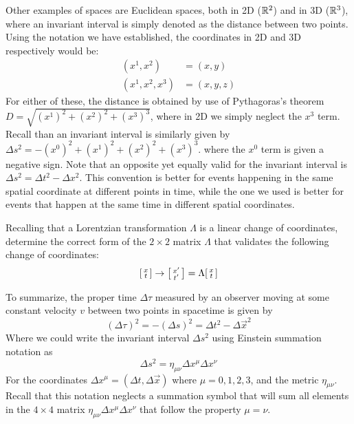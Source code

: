 \documentclass{article}
\begin{document}
 		Other examples of spaces are Euclidean spaces, both in 2D ($\mathbb{R}^2$) and in 3D ($\mathbb{R}^3$), where an invariant interval is simply denoted as the distance between two points. Using the notation we have established, the coordinates in 2D and 3D respectively would be:
 		\begin{align*}
 			(x^1, x^2) &= (x,y) \\
 			(x^1, x^2, x^3) &= (x,y,z)
 		\end{align*}
 		For either of these, the distance is obtained by use of Pythagoras's theorem $D = \sqrt{(x^1)^2 + (x^2)^2 + (x^3)^3}$, where in 2D we simply neglect the $x^3$ term. Recall than an invariant interval is similarly given by $\Delta s^2 = -(x^0)^2 + (x^1)^2 + (x^2)^2 + (x^3)^3$.
 		where the $x^0$ term is given a negative sign. Note that an opposite yet equally valid for the invariant interval is $\Delta s^2 = \Delta t^2 - \Delta x^2 $. This convention is better for events happening in the same spatial coordinate at different points in time, while the one we used is better for events that happen at the same time in different spatial coordinates.
 		\begin{exe}
 			Recalling that a Lorentzian transformation $\Lambda$ is a linear change of coordinates, determine the correct form of the $2 \times 2$ matrix $\Lambda$ that validates the following change of coordinates:
 			$$ \begin{bsmallmatrix}
 				x \\
 				t
 			\end{bsmallmatrix} \to \begin{bsmallmatrix}
 			x' \\
 			t'
 			\end{bsmallmatrix} = \Lambda \begin{bsmallmatrix}
 			x\\t
 		\end{bsmallmatrix}$$
 		\end{exe}
 		
 		To summarize, the proper time $\Delta \tau$ measured by an observer moving at some constant velocity $v$ between two points in spacetime is given by
 		$$ (\Delta \tau)^2 = - (\Delta s)^2 = \Delta t^2 - \Delta \vec{x}^2$$
 		Where we could write the invariant interval $\Delta s^2$ using Einstein summation notation as 
 		$$ \Delta s^2 = \eta_{\mu\nu} \Delta x^\mu \Delta x^\nu$$
 		For the coordinates $\Delta x^\mu = (\Delta t, \Delta \vec{x})$ where $\mu = 0,1,2,3$, and the metric $\eta_{\mu\nu}$. Recall that this notation neglects a summation symbol that will sum all elements in the $4\times4$ matrix $\eta_{\mu\nu} \Delta x^\mu \Delta x^\nu$ that follow the property $\mu = \nu$.
 		
\end{document}
